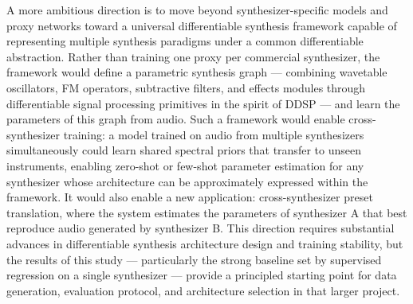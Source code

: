 \noindent
A more ambitious direction is to move beyond synthesizer-specific models and proxy networks toward a universal differentiable synthesis framework capable of representing multiple synthesis paradigms under a common differentiable abstraction. Rather than training one proxy per commercial synthesizer, the framework would define a parametric synthesis graph — combining wavetable oscillators, FM operators, subtractive filters, and effects modules through differentiable signal processing primitives in the spirit of DDSP \cite{engel2020ddsp} — and learn the parameters of this graph from audio. Such a framework would enable cross-synthesizer training: a model trained on audio from multiple synthesizers simultaneously could learn shared spectral priors that transfer to unseen instruments, enabling zero-shot or few-shot parameter estimation for any synthesizer whose architecture can be approximately expressed within the framework. It would also enable a new application: cross-synthesizer preset translation, where the system estimates the parameters of synthesizer A that best reproduce audio generated by synthesizer B. This direction requires substantial advances in differentiable synthesis architecture design and training stability, but the results of this study — particularly the strong baseline set by supervised regression on a single synthesizer — provide a principled starting point for data generation, evaluation protocol, and architecture selection in that larger project.
